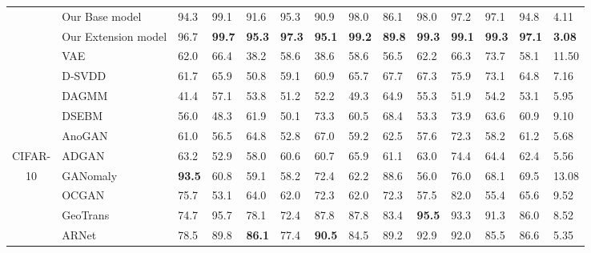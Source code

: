 \documentclass[journal]{IEEEtran}
\theoremstyle{remark}
\begin{document}
\begin{table*}[!htb]
\begin{minipage}[t]{0.95\textwidth}
\begin{tabular}{cx{3.0cm}x{0.6cm}x{0.6cm}x{0.6cm}x{0.6cm}x{0.6cm}x{0.6cm}x{0.6cm}x{0.6cm}x{0.6cm}x{0.6cm}x{0.6cm}x{0.8cm}}
        & Our Base model & 94.3 & 99.1 & 91.6 & 95.3 & 90.9 & 98.0 & 86.1 & 98.0 & 97.2 & 97.1 & 94.8 & 4.11\\
		& Our Extension model & 96.7 & \textbf{99.7} & \textbf{95.3} & \textbf{97.3} & \textbf{95.1} & \textbf{99.2} & \textbf{89.8} & \textbf{99.3} & \textbf{99.1} & \textbf{99.3} & \textbf{97.1} & \textbf{3.08}\\
        \cmidrule(lr){1-14}
	& VAE~\cite{kingma2013auto} 
	& 62.0 & 66.4 & 38.2 & 58.6 & 38.6 & 58.6 & 56.5 & 62.2 & 66.3 & 73.7 & 58.1 & 11.50\\
	& D-SVDD~\cite{SVDD}
	& 61.7 & 65.9 & 50.8 & 59.1 & 60.9 & 65.7 & 67.7 & 67.3 & 75.9 & 73.1 & 64.8 & 7.16\\
	& DAGMM~\cite{zhai2016deep} 
	& 41.4 & 57.1 & 53.8 & 51.2 & 52.2 & 49.3 & 64.9 & 55.3 & 51.9 & 54.2 & 53.1 & 5.95\\
	& DSEBM~\cite{zong2018deep} 
	& 56.0 & 48.3 & 61.9 & 50.1 & 73.3 & 60.5 & 68.4 & 53.3 & 73.9 & 63.6 & 60.9 & 9.10\\
	& AnoGAN~\cite{schlegl2017unsupervised} 
	& 61.0 & 56.5 & 64.8 & 52.8 & 67.0 & 59.2 & 62.5 & 57.6 & 72.3 & 58.2 & 61.2 & 5.68\\
	CIFAR- & ADGAN~\cite{deecke2018anomaly} 
	& 63.2 & 52.9 & 58.0 & 60.6 & 60.7 & 65.9 & 61.1 & 63.0 & 74.4 & 64.4 & 62.4 & 5.56\\
	10 & GANomaly~\cite{Akcay2018} 
	& \textbf{93.5} & 60.8 & 59.1 & 58.2 & 72.4 & 62.2 & 88.6 & 56.0 & 76.0 & 68.1 & 69.5 & 13.08\\
	& OCGAN~\cite{OCGAN} 
	& 75.7 & 53.1 & 64.0 & 62.0 & 72.3 & 62.0 & 72.3 & 57.5 & 82.0 & 55.4 & 65.6 & 9.52\\
	& GeoTrans~\cite{golan2018deep} 
	& 74.7 & 95.7 & 78.1 & 72.4 & 87.8 & 87.8 & 83.4 & \textbf{95.5} & 93.3 & 91.3 & 86.0 & 8.52\\
	& ARNet~\cite{fye2020ARNet} & 78.5 & 89.8 & \textbf{86.1} & 77.4 & \textbf{90.5} & 84.5 & 89.2 & 92.9 & 92.0 & 85.5 & 86.6 & 5.35\\
	\cmidrule(lr){2-2} \cmidrule(lr){3-3} \cmidrule(lr){4-4} \cmidrule(lr){5-5} \cmidrule(lr){6-6} \cmidrule(lr){7-7} \cmidrule(lr){8-8} \cmidrule(lr){9-9} \cmidrule(lr){10-10} \cmidrule(lr){11-11} \cmidrule(lr){12-12} \cmidrule(lr){13-13} \cmidrule(lr){14-14}
    

\end{tabular}
\end{minipage}
\end{table*}
\end{document}
